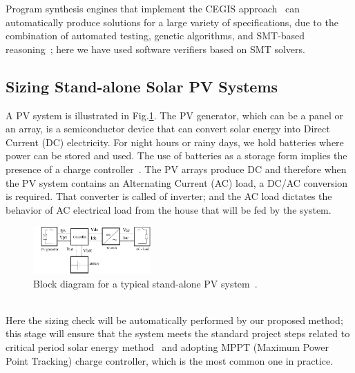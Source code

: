 \documentclass[10pt,conference]{IEEEtran}
\begin{document}
Program synthesis engines that implement the CEGIS approach~\cite{sketch} can automatically produce solutions for a large variety of specifications, due to the combination of automated testing, genetic algorithms, and SMT-based reasoning~\cite{Sharma14}; here we have used software verifiers based on SMT solvers.%
%
\subsection{Sizing Stand-alone Solar PV Systems}
\label{sec:sizing}
A PV system is illustrated in Fig.\ref{fig:blockdiagram}. %
The PV generator, which can be a panel or an array, is a semiconductor device that can convert solar energy into Direct Current (DC) electricity. %
For night hours or rainy days, we hold batteries where power can be stored and used. The use of batteries as a storage form implies the presence of a charge controller~\cite{Hansen}. The PV arrays produce DC and therefore when the PV system contains an Alternating Current (AC) load, a DC/AC conversion is required. That converter is called of inverter; and the AC load dictates the behavior of AC electrical load from the house that will be fed by the system.
\begin{figure}[h]
\includegraphics[width=0.4\textwidth]{blockdiagramPVS2_rev}
\centering
\caption{Block diagram for a typical stand-alone PV system~\cite{Hansen}.}
\label{fig:blockdiagram} 
\end{figure}
\\
%
Here the sizing check will be automatically performed by our proposed method; this stage will ensure that the system meets the standard project steps related to critical period solar energy method~\cite{Pinho} and adopting MPPT (Maximum Power Point Tracking) charge controller, which is the most common one in practice. 
\end{document}
